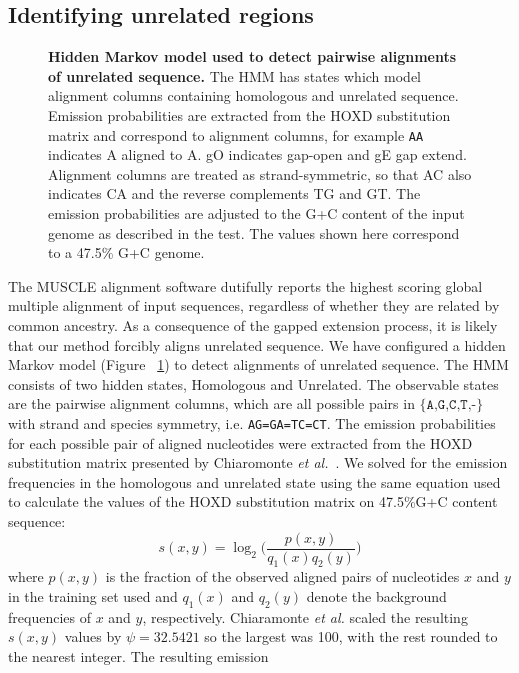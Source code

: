 \documentclass{llncs}
\begin{document}
\subsection{Identifying unrelated regions}
\begin{figure}[t]
\centering {}
\caption{\textbf{Hidden Markov model used to detect pairwise alignments of unrelated
sequence.} The HMM has states which model alignment columns containing
homologous and unrelated sequence. Emission probabilities are extracted from the HOXD substitution matrix and correspond to alignment
columns, for example \texttt{AA} indicates A aligned to A.  gO
indicates gap-open and gE gap extend. Alignment columns are treated as
strand-symmetric, so that AC also indicates CA and the reverse
complements TG and GT.  The emission probabilities are adjusted to the G+C content of the input genome
as described in the test.  The values shown here correspond to a 47.5\% G+C genome.}
\label{fig-hmm}
\end{figure}
The MUSCLE alignment software dutifully reports the highest scoring
global multiple alignment of input sequences, regardless of whether
they are related by common ancestry. As a consequence of the gapped
extension process, it is likely that our method forcibly aligns unrelated
sequence. We have configured a hidden Markov model (Figure
~\ref{fig-hmm}) to detect alignments of unrelated sequence. The HMM
consists of two hidden states, Homologous and Unrelated. The
observable states are the pairwise alignment columns, which are all
possible pairs in $\texttt{{\{A,G,C,T,-\}}}$ with strand and species
symmetry, i.e. \texttt{AG=GA=TC=CT}. The emission probabilities for
each possible pair of aligned nucleotides were extracted from the HOXD
substitution matrix presented by Chiaromonte \textit{et al.}~\cite{hoxd}.
We solved for the emission frequencies in the
homologous and unrelated state using the same equation used to
calculate the values of the HOXD substitution matrix on 47.5\%G+C
content sequence\cite{hoxd}:
\begin{equation}
s(x,y)= \log_{2}{\Bigg(\frac{p(x,y)}{q_{1}(x)q_{2}(y)}\Bigg)}
\end{equation}
{w}here $p(x,y)$ is the fraction of the observed aligned pairs of
nucleotides $x$ and $y$ in the training set used and $q_{1}(x)$ and
$q_{2}(y)$ denote the background frequencies of $x$ and $y$,
respectively. Chiaramonte \textit{et al.} scaled the resulting
$s(x,y)$ values by $\psi=32.5421$ so the largest was 100,
with the rest rounded to the nearest integer.  The resulting emission
\end{document}

